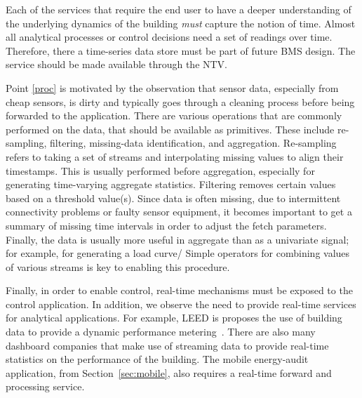 Each of the services that require the end user to have a deeper understanding of the underlying dynamics 
of the building \emph{must} capture the notion of time.  Almost all analytical processes or control decisions need a set of readings
over time.  Therefore, there a time-series data store must be part of future BMS design.  The service should be made available
through the NTV.  %

Point \ref{proc} is motivated by the observation that sensor data, especially from cheap sensors, is dirty and typically goes
through a cleaning process before being forwarded to the application.  There are various operations that are commonly
performed on the data, that should be available as primitives.  These include re-sampling, filtering,  
missing-data identification, and aggregation.  Re-sampling refers to taking a set of streams and interpolating missing values to 
align their timestamps.  This is usually performed before aggregation, especially for generating time-varying aggregate statistics.
Filtering removes certain values based on a threshold value(s).  
Since data is often missing, due to intermittent connectivity problems or faulty sensor equipment, it becomes important to 
get a summary of missing time intervals in order to adjust the fetch parameters.  Finally, the data is usually more
useful in aggregate than as a univariate signal; for example, for generating a load curve/ %
Simple operators for combining values of various streams is key to enabling this procedure.

Finally, in order to enable control, real-time mechanisms must be exposed to the control application.
In addition, we observe the need to provide real-time services for analytical applications.
For example, LEED is proposes the use of building data to provide a dynamic performance metering~\cite{dynleed}.
There are also many dashboard companies that make use of streaming data to provide real-time statistics on the performance of the
building.  The mobile energy-audit application, from Section~\ref{sec:mobile}, also requires a real-time forward and processing service.

